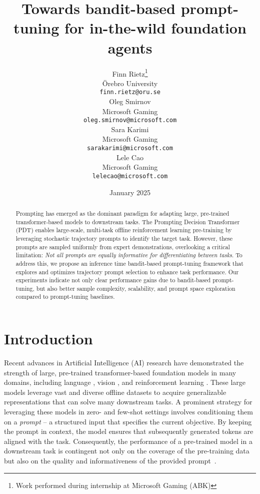 \documentclass{article}
\title{Towards bandit-based prompt-tuning for in-the-wild foundation agents}
\date{January 2025}
\author{%
Finn Rietz\thanks{Work performed during internship at Microsoft Gaming (ABK)} \\
Örebro University\\
\texttt{finn.rietz@oru.se}\\
\And
Oleg Smirnov \\
Microsoft Gaming\\
\texttt{oleg.smirnov@microsoft.com}\\
\And
Sara Karimi \\
Microsoft Gaming\\
\texttt{sarakarimi@microsoft.com}\\
\And
Lele Cao\\
Microsoft Gaming\\
\texttt{lelecao@microsoft.com}
}
\begin{document}
\maketitle

\begin{abstract}
    Prompting has emerged as the dominant paradigm for adapting large, pre-trained transformer-based models to downstream tasks. The Prompting Decision Transformer (PDT) enables large-scale, multi-task offline reinforcement learning pre-training by leveraging stochastic trajectory prompts to identify the target task. However, these prompts are sampled uniformly from expert demonstrations, overlooking a critical limitation: \textit{Not all prompts are equally informative for differentiating between tasks}. To address this, we propose an inference time bandit-based prompt-tuning framework that explores and optimizes trajectory prompt selection to enhance task performance.
    Our experiments indicate not only clear performance gains due to bandit-based prompt-tuning, but also better sample complexity, scalability, and prompt space exploration compared to prompt-tuning baselines.  
\end{abstract}

\section{Introduction}
Recent advances in Artificial Intelligence (AI) research have demonstrated the strength of large, pre-trained transformer-based foundation models in many domains, including language \citep{radford2018improving, brown2020language}, vision \citep{radford2021learning, dosovitskiy2020image}, and reinforcement learning \citep{reed2022generalist, li2023survey}. These large models leverage vast and diverse offline datasets to acquire generalizable representations that can solve many downstream tasks.
A prominent strategy for leveraging these models in zero- and few-shot settings involves conditioning them on a \textit{prompt} -- a structured input that specifies the current objective.
By keeping the prompt in context, the model ensures that subsequently generated tokens are aligned with the task. Consequently, the performance of a pre-trained model in a downstream task is contingent not only on the coverage of the pre-training data but also on the quality and informativeness of the provided prompt~\citep{hu2023prompt, lin2023use, lester2021power}.
\end{document}
